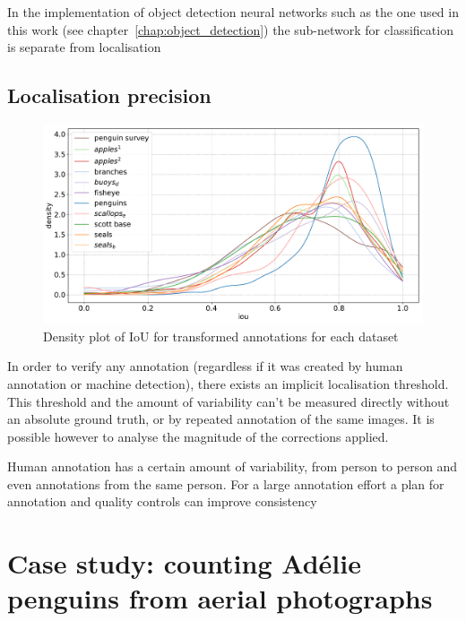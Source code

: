 In the implementation of object detection neural networks such as the one used in this work (see chapter~\ref{chap:object_detection}) the sub-network for classification is separate from localisation




\subsection{ Localisation precision }
\label{sec:localisation_precision}

\begin{figure}[ht]
\centering
\includegraphics[width=1.0\linewidth]{charts/scatters/iou_dataset.pdf}
\caption{ Density plot of IoU for transformed annotations for each dataset }
\label{fig:density_iou}
\end{figure}



In order to verify any annotation (regardless if it was created by human annotation or machine detection), there exists an implicit localisation threshold. This threshold and the amount of variability can't be measured directly without an absolute ground truth, or by repeated annotation of the same images. It is possible however to analyse the magnitude of the corrections applied.



Human annotation has a certain amount of variability, from person to person and even annotations from the same person. For a large annotation effort a plan for annotation and quality controls can improve consistency







\section{Case study: counting Adélie penguins from aerial photographs}



